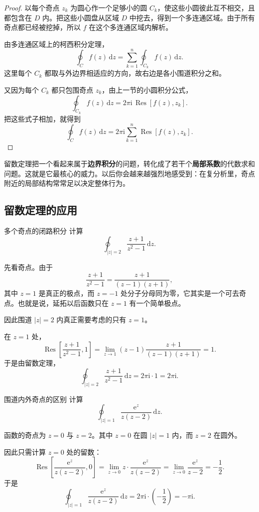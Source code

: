 \begin{proof}
以每个奇点 $z_k$ 为圆心作一个足够小的圆 $C_k$，使这些小圆彼此互不相交，且都包含在 $D$ 内。把这些小圆盘从区域 $D$ 中挖去，得到一个多连通区域。由于所有奇点都已经被挖掉，所以 $f$ 在这个多连通区域内解析。

由多连通区域上的柯西积分定理，
\[
    \oint_C f(z)\,\mathrm{d}z
    =
    \sum_{k=1}^{n}\oint_{C_k} f(z)\,\mathrm{d}z.
\]
这里每个 $C_k$ 都取与外边界相适应的方向，故右边是各小围道积分之和。

又因为每个 $C_k$ 都只包围奇点 $z_k$，由上一节的小圆积分公式，
\[
    \oint_{C_k} f(z)\,\mathrm{d}z
    =
    2\pi \mathrm{i}\,\operatorname{Res}[f(z),z_k].
\]
把这些式子相加，就得到
\[
    \oint_C f(z)\,\mathrm{d}z
    =
    2\pi \mathrm{i}\sum_{k=1}^{n}\operatorname{Res}[f(z),z_k].
\]
\end{proof}

\begin{tishi}[留数定理真正重要在哪里]
留数定理把一个看起来属于\textbf{边界积分}的问题，转化成了若干个\textbf{局部系数}的代数求和问题。这就是它最核心的威力。以后你会越来越强烈地感受到：在复分析里，奇点附近的局部结构常常足以决定整体行为。
\end{tishi}

\subsection{留数定理的应用}

\begin{lizi}{多个奇点的闭路积分}{}
计算
\[
    \oint_{|z|=2}\frac{z+1}{z^2-1}\,\mathrm{d}z.
\]

\begin{jie}
先看奇点。由于
\[
    \frac{z+1}{z^2-1}
    =
    \frac{z+1}{(z-1)(z+1)},
\]
其中 $z=1$ 是真正的极点，而 $z=-1$ 处分子分母同为零，它其实是一个可去奇点。也就是说，延拓以后函数只在 $z=1$ 有一个简单极点。

因此围道 $|z|=2$ 内真正需要考虑的只有 $z=1$。

在 $z=1$ 处，
\[
    \operatorname{Res}\left[\frac{z+1}{z^2-1},1\right]
    =
    \lim_{z\to 1}(z-1)\frac{z+1}{(z-1)(z+1)}
    =1.
\]
于是由留数定理，
\[
    \oint_{|z|=2}\frac{z+1}{z^2-1}\,\mathrm{d}z
    =
    2\pi \mathrm{i}\cdot 1
    =
    2\pi \mathrm{i}.
\]
\end{jie}
\end{lizi}

\begin{lizi}{围道内外奇点的区别}{}
计算
\[
    \oint_{|z|=1}\frac{\mathrm{e}^z}{z(z-2)}\,\mathrm{d}z.
\]

\begin{jie}
函数的奇点为 $z=0$ 与 $z=2$。其中 $z=0$ 在圆 $|z|=1$ 内，而 $z=2$ 在圆外。

因此只需计算 $z=0$ 处的留数：
\[
    \operatorname{Res}\left[\frac{\mathrm{e}^z}{z(z-2)},0\right]
    =
    \lim_{z\to 0}
    z\cdot \frac{\mathrm{e}^z}{z(z-2)}
    =
    \lim_{z\to 0}\frac{\mathrm{e}^z}{z-2}
    =
    -\frac{1}{2}.
\]
于是
\[
    \oint_{|z|=1}\frac{\mathrm{e}^z}{z(z-2)}\,\mathrm{d}z
    =
    2\pi \mathrm{i}\cdot \left(-\frac{1}{2}\right)
    =
    -\pi \mathrm{i}.
\]
\end{jie}
\end{lizi}

